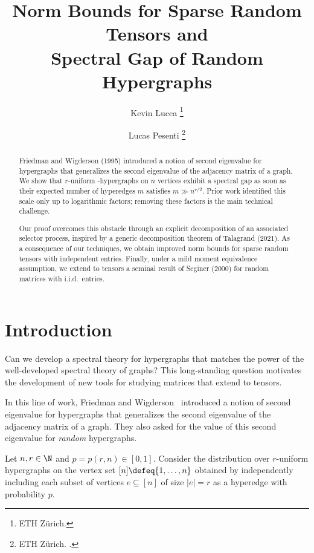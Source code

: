 \documentclass[11pt,a4paper]{article}
\title{Norm Bounds for Sparse Random Tensors and\\ Spectral Gap of Random Hypergraphs}
\author{
  Kevin Lucca%
  \thanks{ETH Zürich. \email{kevin.lucca@ifor.math.ethz.ch}}
  \and
  Lucas Pesenti%
  \thanks{ETH Zürich. \email{lpesenti@ethz.ch}.}
}
\begin{document}
    \maketitle

    \begin{abstract}
        Friedman and Wigderson (1995) introduced a notion of second
        eigenvalue for hypergraphs that generalizes the second eigenvalue of the
        adjacency matrix of a graph. We show that $r$-uniform
        \Erdos-\Renyi hypergraphs on $n$ vertices exhibit a spectral gap
        as soon as their expected number of hyperedges $m$ satisfies $m \gg n^{r/2}$. Prior work identified this scale only up to logarithmic factors; removing these factors is the main technical challenge.
        
        Our proof overcomes this obstacle through an explicit decomposition of an associated selector process,
        inspired by a generic decomposition
        theorem of
        Talagrand (2021).
        As a consequence of our techniques, we obtain improved norm bounds for sparse random tensors with independent entries. Finally, under a mild moment equivalence assumption, we extend to tensors a seminal result of Seginer (2000) for random matrices with i.i.d.\ entries.
    \end{abstract}

\section{Introduction}
\label{sec:intro}


Can we develop a spectral theory for hypergraphs that matches the power of the
well-developed spectral theory of graphs? This long-standing question motivates
the development of new tools for studying matrices that extend to tensors.

In this line of work, Friedman and Wigderson~\cite{friedmanWigderson} introduced a notion of second
eigenvalue for hypergraphs that generalizes the second eigenvalue of
the adjacency matrix of a graph.
They also asked for the value of this second eigenvalue for {\em random} hypergraphs.

\begin{definition}\label{def:erdos}
    Let $n, r\in \N$ and $p=p(r,n)\in [0,1]$. Consider the distribution over
	$r$-uniform hypergraphs on the vertex set $[n] \defeq \{1, \ldots, n\}$
    obtained by independently including each subset 
    of vertices $e\subseteq [n]$
    of size $|e|=r$ as a hyperedge with
    probability $p$. 
\end{definition}
\end{document}
